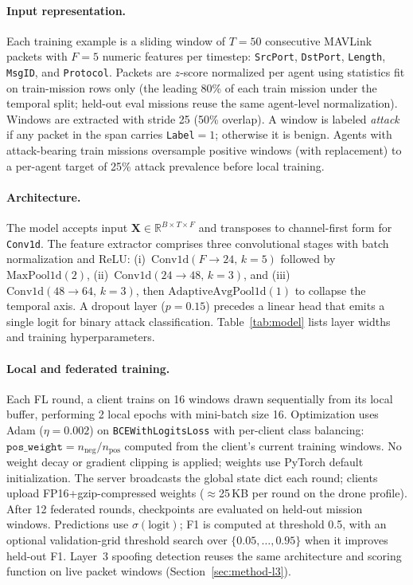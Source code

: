 \paragraph{Input representation.}
Each training example is a sliding window of $T{=}50$ consecutive MAVLink packets with $F{=}5$ numeric features per timestep: \texttt{SrcPort}, \texttt{DstPort}, \texttt{Length}, \texttt{MsgID}, and \texttt{Protocol}.
Packets are $z$-score normalized per agent using statistics fit on train-mission rows only (the leading 80\% of each train mission under the temporal split; held-out eval missions reuse the same agent-level normalization).
Windows are extracted with stride 25 (50\% overlap).
A window is labeled \emph{attack} if any packet in the span carries \texttt{Label}${=}1$; otherwise it is benign.
Agents with attack-bearing train missions oversample positive windows (with replacement) to a per-agent target of 25\% attack prevalence before local training.

\paragraph{Architecture.}
The model accepts input $\mathbf{X} \in \mathbb{R}^{B \times T \times F}$ and transposes to channel-first form for \texttt{Conv1d}.
The feature extractor comprises three convolutional stages with batch normalization and ReLU:
(i)~$\mathrm{Conv1d}(F{\rightarrow}24,\,k{=}5)$ followed by $\mathrm{MaxPool1d}(2)$,
(ii)~$\mathrm{Conv1d}(24{\rightarrow}48,\,k{=}3)$,
and (iii)~$\mathrm{Conv1d}(48{\rightarrow}64,\,k{=}3)$,
then $\mathrm{AdaptiveAvgPool1d}(1)$ to collapse the temporal axis.
A dropout layer ($p{=}0.15$) precedes a linear head that emits a single logit for binary attack classification.
Table~\ref{tab:model} lists layer widths and training hyperparameters.

\paragraph{Local and federated training.}
Each FL round, a client trains on 16 windows drawn sequentially from its local buffer, performing 2 local epochs with mini-batch size 16.
Optimization uses Adam ($\eta{=}0.002$) on \texttt{BCEWithLogitsLoss} with per-client class balancing: $\texttt{pos\_weight} = n_{\mathrm{neg}}/n_{\mathrm{pos}}$ computed from the client's current training windows.
No weight decay or gradient clipping is applied; weights use PyTorch default initialization.
The server broadcasts the global state dict each round; clients upload FP16+gzip-compressed weights ($\approx$25\,KB per round on the drone profile).
After 12 federated rounds, checkpoints are evaluated on held-out mission windows.
Predictions use $\sigma(\text{logit})$; F1 is computed at threshold 0.5, with an optional validation-grid threshold search over $\{0.05,\ldots,0.95\}$ when it improves held-out F1.
Layer~3 spoofing detection reuses the same architecture and scoring function on live packet windows (Section~\ref{sec:method-l3}).

